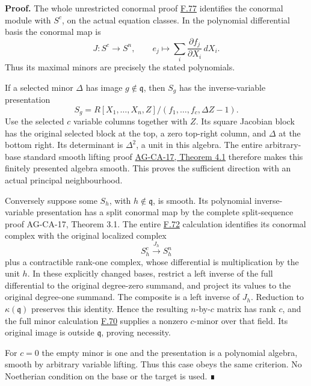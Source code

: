\documentclass[11pt,a4paper,openany]{report}
\begin{document}
\textbf{Proof.} The whole unrestricted conormal proof \hyperref[AG-RG-S05-algebra-lemma-relative-global-complete-intersection-conormal]{F.77} identifies the conormal module with \(S^c\), on the actual equation classes. In the polynomial differential basis the conormal map is \[J:S^c\longrightarrow S^n,\qquad
e_j\longmapsto\sum_i\frac{\partial f_j}{\partial X_i}\,dX_i.\] Thus its maximal minors are precisely the stated polynomials.

If a selected minor \(\Delta\) has image \(g\notin\mathfrak q\), then \(S_g\) has the inverse-variable presentation \[S_g=R[X_1,\ldots,X_n,Z]/(f_1,\ldots,f_c,\Delta Z-1).\] Use the selected \(c\) variable columns together with \(Z\). Its square Jacobian block has the original selected block at the top, a zero top-right column, and \(\Delta\) at the bottom right. Its determinant is \(\Delta^2\), a unit in this algebra. The entire arbitrary-base standard smooth lifting proof \href{https://github.com/KokunoYumeto/open-math-courses/blob/d02d0a3669f42579db037cd44de1d113fdd770a1/docs/courses/AG-CA/src/formally-smooth-unramified-and-etale-ring-maps.md}{AG-CA-17, Theorem 4.1} therefore makes this finitely presented algebra smooth. This proves the sufficient direction with an actual principal neighbourhood.

Conversely suppose some \(S_h\), with \(h\notin\mathfrak q\), is smooth. Its polynomial inverse-variable presentation has a split conormal map by the complete split-sequence proof AG-CA-17, Theorem 3.1. The entire \hyperref[AG-RG-S05-algebra-lemma-principal-localization-NL]{F.72} calculation identifies its conormal complex with the original localized complex \[S_h^c\xrightarrow{J_h}S_h^n\] plus a contractible rank-one complex, whose differential is multiplication by the unit \(h\). In these explicitly changed bases, restrict a left inverse of the full differential to the original degree-zero summand, and project its values to the original degree-one summand. The composite is a left inverse of \(J_h\). Reduction to \(\kappa(\mathfrak q)\) preserves this identity. Hence the resulting \(n\)-by-\(c\) matrix has rank \(c\), and the full minor calculation \hyperref[AG-RG-S05-algebra-lemma-matrix-left-inverse]{F.70} supplies a nonzero \(c\)-minor over that field. Its original image is outside \(\mathfrak q\), proving necessity.

For \(c=0\) the empty minor is one and the presentation is a polynomial algebra, smooth by arbitrary variable lifting. Thus this case obeys the same criterion. No Noetherian condition on the base or the target is used. ∎
\end{document}
